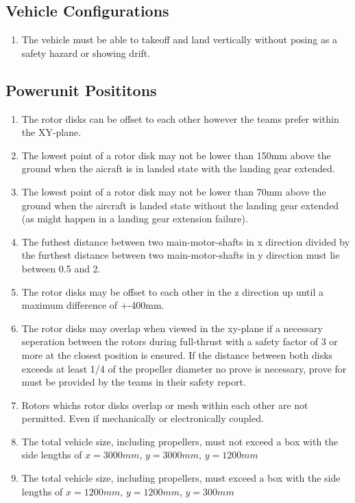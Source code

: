 \documentclass{article}
\begin{document}
\subsection{Vehicle Configurations}
\begin{enumerate}
  \item The vehicle must be able to takeoff and land vertically without posing as a safety hazard or showing drift.  
\end{enumerate}

\subsection{Powerunit Posititons}
\begin{enumerate}
  \item The rotor disks can be offset to each other however the teams prefer within the XY-plane. 
  \item The lowest point of a rotor disk may not be lower than 150mm above the ground when the aicraft is in landed state with the landing gear extended.
  \item The lowest point of a rotor disk may not be lower than 70mm above the ground when the aircraft is landed state without the landing gear extended (as might happen in a landing gear extension failure).
  \item The futhest distance between two main-motor-shafts in x direction divided by the furthest distance between two main-motor-shafts in y direction must lie between 0.5 and 2. 
  \item The rotor disks may be offset to each other in the z direction up until a maximum difference of +-400mm.
  \item The rotor disks may overlap when viewed in the xy-plane if a necessary seperation between the rotors during full-thrust with a safety factor of 3 or more at the closest position is ensured. If the distance between both disks exceeds at least 1/4 of the propeller diameter no prove is necessary, prove for must be provided by the teams in their safety report. 
  \item Rotors whichs rotor disks overlap or mesh within each other are not permitted. Even if mechanically or electronically coupled.
  \item The total vehicle size, including propellers, must not exceed a box with the side lengths of $x=3000mm$, $y=3000mm$, $y=1200mm$
  \item The total vehicle size, including propellers, must exceed a box with the side lengths of $x=1200mm$, $y=1200mm$, $y=300mm$
\end{enumerate}
\end{document}
